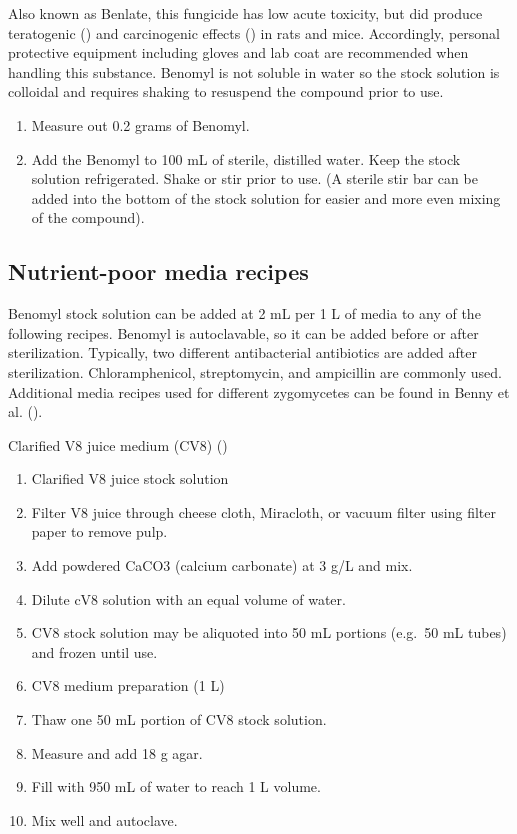 \documentclass[]{book}
\providecommand{\tightlist}{%
  \setlength{\itemsep}{0pt}\setlength{\parskip}{0pt}}
\begin{document}
Also known as Benlate, this fungicide has low acute toxicity, but did
produce teratogenic (\citet{Cummings_1992}) and carcinogenic effects
(\citet{NRC_1987}) in rats and mice. Accordingly, personal protective
equipment including gloves and lab coat are recommended when handling
this substance. Benomyl is not soluble in water so the stock solution is
colloidal and requires shaking to resuspend the compound prior to use.

\begin{enumerate}
\def\labelenumi{\arabic{enumi}.}
\tightlist
\item
  Measure out 0.2 grams of Benomyl.
\item
  Add the Benomyl to 100 mL of sterile, distilled water. Keep the stock
  solution refrigerated. Shake or stir prior to use. (A sterile stir bar
  can be added into the bottom of the stock solution for easier and more
  even mixing of the compound).
\end{enumerate}

\subsection{Nutrient-poor media
recipes}\label{nutrient-poor-media-recipes}

Benomyl stock solution can be added at 2 mL per 1 L of media to any of
the following recipes. Benomyl is autoclavable, so it can be added
before or after sterilization. Typically, two different antibacterial
antibiotics are added after sterilization. Chloramphenicol,
streptomycin, and ampicillin are commonly used. Additional media recipes
used for different zygomycetes can be found in Benny et al.
(\citet{Benny_2016}).

{Clarified V8 juice medium} (CV8) (\citet{Benny_2016})

\begin{enumerate}
\def\labelenumi{\arabic{enumi}.}
\tightlist
\item
  Clarified V8 juice stock solution
\item
  Filter V8 juice through cheese cloth, Miracloth, or vacuum filter
  using filter paper to remove pulp.
\item
  Add powdered CaCO3 (calcium carbonate) at 3 g/L and mix.
\item
  Dilute cV8 solution with an equal volume of water.
\item
  CV8 stock solution may be aliquoted into 50 mL portions (e.g.~50 mL
  tubes) and frozen until use.
\item
  CV8 medium preparation (1 L)
\item
  Thaw one 50 mL portion of CV8 stock solution.
\item
  Measure and add 18 g agar.
\item
  Fill with 950 mL of water to reach 1 L volume.
\item
  Mix well and autoclave.
\end{enumerate}
\end{document}
